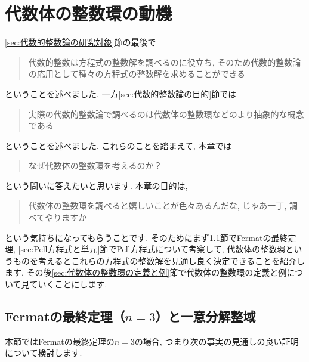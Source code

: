\documentclass[11pt,b5paper,oneside,titlepage,lualatex]{ltjsreport}
\begin{document}
\clearpage





\chapter{代数体の整数環の動機} \label{chap:代数体の整数環の動機}


\ref{sec:代数的整数論の研究対象}節の最後で
\begin{quote}
	\centering
	代数的整数は方程式の整数解を調べるのに役立ち, そのため代数的整数論の応用として種々の方程式の整数解を求めることができる
\end{quote}
ということを述べました. 
一方\ref{sec:代数的整数論の目的}節では
\begin{quote}
	\centering
	実際の代数的整数論で調べるのは代数体の整数環などのより抽象的な概念である
\end{quote}
ということを述べました. 
これらのことを踏まえて, 本章では
\begin{quote}
	\centering
	なぜ代数体の整数環を考えるのか？
\end{quote}
という問いに答えたいと思います. 
本章の目的は, 
\begin{quote}
	\centering
	代数体の整数環を調べると嬉しいことが色々あるんだな, じゃあ一丁, 調べてやりますか
\end{quote}
という気持ちになってもらうことです. 
そのためにまず\ref{sec:Fermatの最終定理と一意分解整域}節でFermatの最終定理, \ref{sec:Pell方程式と単元}節でPell方程式について考察して, 代数体の整数環というものを考えるとこれらの方程式の整数解を見通し良く決定できることを紹介します. 
その後\ref{sec:代数体の整数環の定義と例}節で代数体の整数環の定義と例について見ていくことにします. 


\section{Fermatの最終定理（$ n=3 $）と一意分解整域} \label{sec:Fermatの最終定理と一意分解整域}


本節ではFermatの最終定理の$ n=3 $の場合, つまり次の事実の見通しの良い証明について検討します. 
\end{document}
